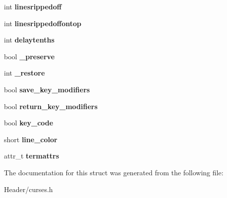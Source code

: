 \begin{DoxyCompactItemize}
int {\bfseries linesrippedoff}
\item 
\mbox{\label{structSCREEN_a9d75285c9ed48566c7b0ff1a4539bf36}} 
int {\bfseries linesrippedoffontop}
\item 
\mbox{\label{structSCREEN_a1fd9a6410b8e9f441a2a2e6cfb6902ee}} 
int {\bfseries delaytenths}
\item 
\mbox{\label{structSCREEN_aa6b550ce6e49a6c33b75e63fde075804}} 
bool {\bfseries \+\_\+preserve}
\item 
\mbox{\label{structSCREEN_a581ba21ddeb1fbdb2fd5bdcf66b72418}} 
int {\bfseries \+\_\+restore}
\item 
\mbox{\label{structSCREEN_a56c7e83d8e7161ab3efb7de56db24547}} 
bool {\bfseries save\+\_\+key\+\_\+modifiers}
\item 
\mbox{\label{structSCREEN_a0f9e057cb80774110c4f1206c99114dd}} 
bool {\bfseries return\+\_\+key\+\_\+modifiers}
\item 
\mbox{\label{structSCREEN_a9f50e5ebf36cde39e998afc4a6367517}} 
bool {\bfseries key\+\_\+code}
\item 
\mbox{\label{structSCREEN_a86f34459ac289af2c239ff0ece3bcb52}} 
short {\bfseries line\+\_\+color}
\item 
\mbox{\label{structSCREEN_aa95db33d3e6410a53fc6ec46de5dc1d0}} 
attr\+\_\+t {\bfseries termattrs}
\end{DoxyCompactItemize}


The documentation for this struct was generated from the following file\+:\begin{DoxyCompactItemize}
\item 
Header/curses.\+h\end{DoxyCompactItemize}
